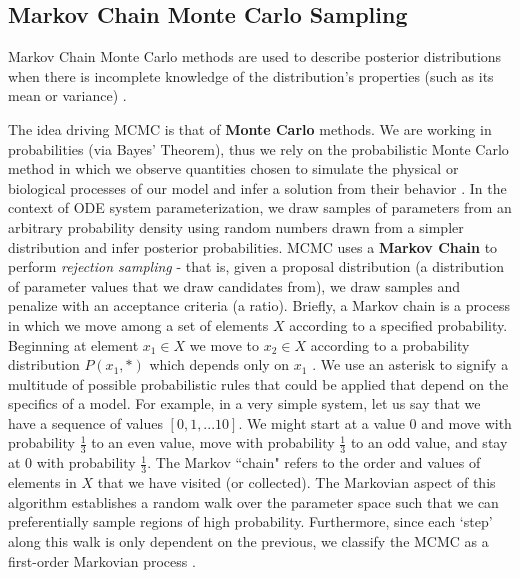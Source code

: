 \subsection{Markov Chain Monte Carlo Sampling} \label{Markov_Chain_Monte_Carlo_Sampling}
Markov Chain Monte Carlo methods are used to describe posterior distributions when there is incomplete knowledge of the distribution's properties (such as its mean or variance) \cite{MLEvsBayes_powerpoint}. 
\par The idea driving MCMC is that of \textbf{Monte Carlo} methods. We are working in probabilities (via Bayes' Theorem), thus we rely on the probabilistic Monte Carlo method in which we observe quantities chosen to simulate the physical or biological processes of our model and infer a solution from their behavior \cite{montecarlo}. In the context of ODE system parameterization, we draw samples of parameters from an arbitrary probability density using random numbers drawn from a simpler distribution \cite{astrostats} and infer posterior probabilities. MCMC uses a \textbf{Markov Chain} to perform \emph{rejection sampling} - that is, given a proposal distribution (a distribution of parameter values that we draw candidates from), we draw samples and penalize with an acceptance criteria (a ratio). Briefly, a Markov chain is a process in which we move among a set of elements $X$ according to a specified probability. Beginning at element $x_1 \in X$ we move to $x_2 \in X$ according to a probability distribution $P(x_1, *)$ which depends only on $x_1$ \cite{markovchains}. We use an asterisk to signify a multitude of possible probabilistic rules that could be applied that depend on the specifics of a model. For example, in a very simple system, let us say that we have a sequence of values $[0,1,...10]$. We might start at a value 0 and move with probability $\frac{1}{3}$ to an even value, move with probability $\frac{1}{3}$ to an odd value, and stay at 0 with probability $\frac{1}{3}$. The Markov ``chain" refers to the order and values of elements in $X$ that we have visited (or collected).
The Markovian aspect of this algorithm establishes a random walk over the parameter space such that we can preferentially sample regions of high probability. Furthermore, since each `step' along this walk is only dependent on the previous, we classify the MCMC as a first-order Markovian process \cite{firstorderMarkovian}. 

